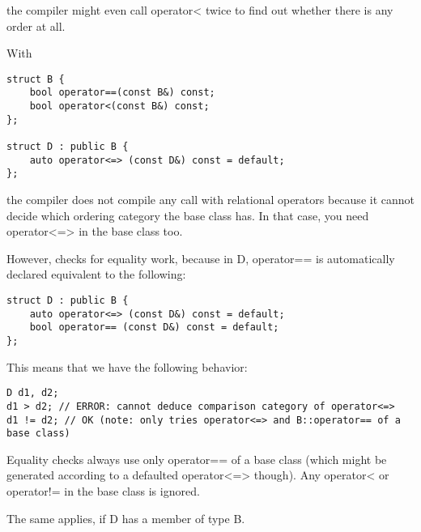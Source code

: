 the compiler might even call operator< twice to find out whether there is any order at all.

With

\begin{lstlisting}[style=styleCXX]
struct B {
	bool operator==(const B&) const;
	bool operator<(const B&) const;
};

struct D : public B {
	auto operator<=> (const D&) const = default;
};
\end{lstlisting}

the compiler does not compile any call with relational operators because it cannot decide which ordering category the base class has. In that case, you need operator<=> in the base class too.

However, checks for equality work, because in D, operator== is automatically declared equivalent to the following:

\begin{lstlisting}[style=styleCXX]
struct D : public B {
	auto operator<=> (const D&) const = default;
	bool operator== (const D&) const = default;
};
\end{lstlisting}

This means that we have the following behavior:

\begin{lstlisting}[style=styleCXX]
D d1, d2;
d1 > d2; // ERROR: cannot deduce comparison category of operator<=>
d1 != d2; // OK (note: only tries operator<=> and B::operator== of a base class)
\end{lstlisting}

Equality checks always use only operator== of a base class (which might be generated according to a defaulted operator<=> though). Any operator< or operator!= in the base class is ignored.

The same applies, if D has a member of type B.
